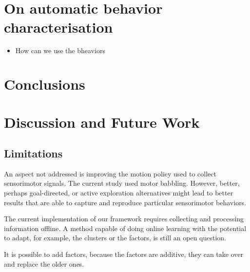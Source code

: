 \section{On automatic behavior characterisation}
\begin{itemize}
    \item How can we use the bheaviors 
\end{itemize}


\section{Conclusions}\label{sec:conclusion}

\section{Discussion and Future Work}

\subsection{Limitations}
An aspect not addressed is improving the motion policy used to collect sensorimotor signals. The current study used motor babbling. However, better, perhaps goal-directed, or active exploration alternatives might lead to better results that are able to capture and reproduce particular sensorimotor behaviors.

The current implementation of our framework requires collecting and processing information offline. A method capable of doing online learning with the potential to adapt, for example, the clusters or the factors, is still an open question.

It is possible to add factors, because the factors are additive, they can take over and replace the older ones.

\printbibliography 
